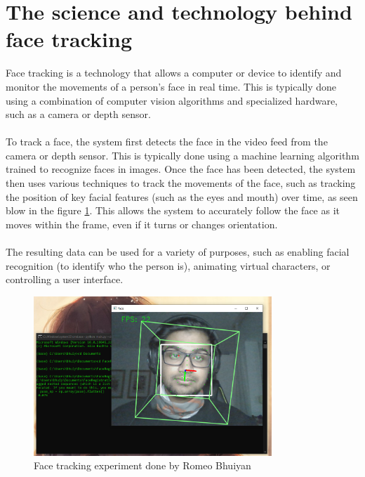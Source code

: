\section{The science and technology behind face tracking}
Face tracking is a technology that allows a computer or device to identify
and monitor the movements of a person's face in real time. 
This is typically done using a combination of computer vision 
algorithms and specialized hardware, such as a camera or depth sensor.
\\
\\
To track a face, the system first detects the face in 
the video feed from the camera or depth sensor. This is 
typically done using a machine learning algorithm trained to 
recognize faces in images. Once the face has been detected, 
the system then uses various techniques to track the movements 
of the face, such as tracking the position of key facial features
(such as the eyes and mouth) over time, as seen blow in the figure \ref{fig:facetracking}.
 This allows the system to accurately follow the face as it moves within the frame, even if it 
turns or changes orientation.
\\
\\
The resulting data can be used for a variety of 
purposes, such as enabling facial recognition 
(to identify who the person is), animating virtual characters, 
or controlling a user interface.
\\
\begin{figure}[htb]
    \centering
    \includegraphics[width=0.8\textwidth]{pics/bhuiyanfracetracking.png}
    \caption{Face tracking experiment done by Romeo Bhuiyan}
    \label{fig:facetracking}
\end{figure}


